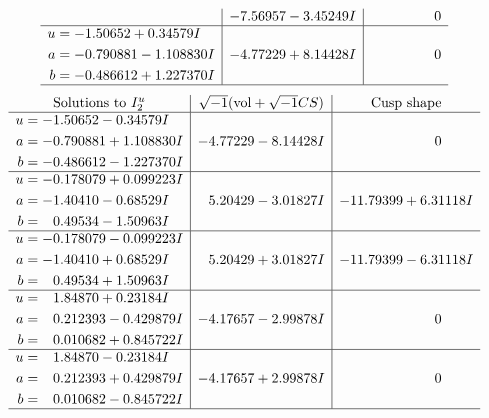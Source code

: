 \documentclass[1p]{elsarticle_modified}
\theoremstyle{definition}
\newcommand{\I}{\sqrt{-1}}
\begin{document}
$$\begin{array}{c|c|c}
 & -7.56957 - 3.45249 I & \phantom{-0.000000 } 0 \\ \hline\begin{aligned}
u &= -1.50652 + 0.34579 I \\
a &= -0.790881 - 1.108830 I \\
b &= -0.486612 + 1.227370 I\end{aligned}
 & -4.77229 + 8.14428 I & \phantom{-0.000000 } 0\\
 \hline 
 \end{array}$$\newpage$$\begin{array}{c|c|c}  
\text{Solutions to }I^u_{2}& \I (\text{vol} + \sqrt{-1}CS) & \text{Cusp shape}\\
 \hline 
\begin{aligned}
u &= -1.50652 - 0.34579 I \\
a &= -0.790881 + 1.108830 I \\
b &= -0.486612 - 1.227370 I\end{aligned}
 & -4.77229 - 8.14428 I & \phantom{-0.000000 } 0 \\ \hline\begin{aligned}
u &= -0.178079 + 0.099223 I \\
a &= -1.40410 - 0.68529 I \\
b &= \phantom{-}0.49534 - 1.50963 I\end{aligned}
 & \phantom{-}5.20429 - 3.01827 I & -11.79399 + 6.31118 I \\ \hline\begin{aligned}
u &= -0.178079 - 0.099223 I \\
a &= -1.40410 + 0.68529 I \\
b &= \phantom{-}0.49534 + 1.50963 I\end{aligned}
 & \phantom{-}5.20429 + 3.01827 I & -11.79399 - 6.31118 I \\ \hline\begin{aligned}
u &= \phantom{-}1.84870 + 0.23184 I \\
a &= \phantom{-}0.212393 - 0.429879 I \\
b &= \phantom{-}0.010682 + 0.845722 I\end{aligned}
 & -4.17657 - 2.99878 I & \phantom{-0.000000 } 0 \\ \hline\begin{aligned}
u &= \phantom{-}1.84870 - 0.23184 I \\
a &= \phantom{-}0.212393 + 0.429879 I \\
b &= \phantom{-}0.010682 - 0.845722 I\end{aligned}
 & -4.17657 + 2.99878 I & \phantom{-0.000000 } 0\\
 \hline 
 \end{array}$$\newpage\newpage\renewcommand{\arraystretch}{1}
\end{document}
